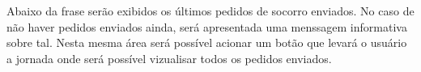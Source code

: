 Abaixo da frase serão exibidos os últimos pedidos de socorro enviados. No caso de não haver pedidos enviados ainda, será apresentada uma menssagem informativa sobre tal. Nesta mesma área será possível acionar um botão que levará o usuário a jornada onde será possível vizualisar todos os pedidos enviados.

